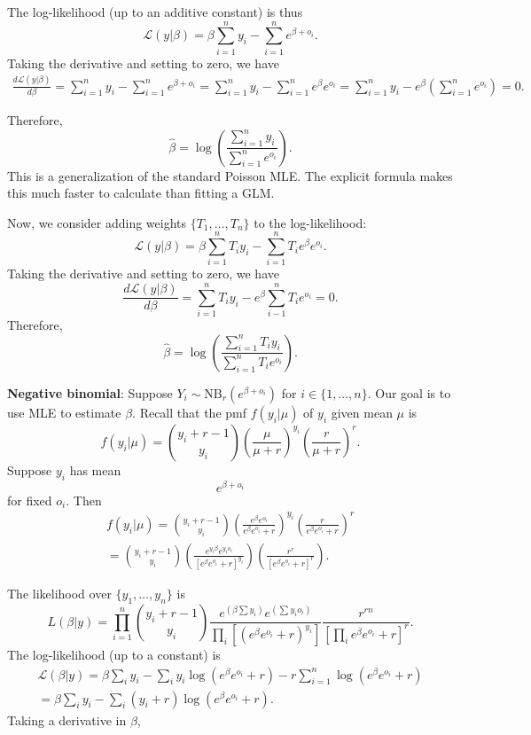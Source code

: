\documentclass[12pt]{article}
\begin{document}
The log-likelihood (up to an additive constant) is thus
$$ \mathcal{L}(y | \beta) = \beta \sum_{i=1}^n y_i -\sum_{i=1}^n e^{\beta + o_i}.$$
Taking the derivative and setting to zero, we have
\begin{multline*} \frac{  d \mathcal{L}(y | \beta) }{ d \beta} = \sum_{i=1}^n y _i - \sum_{i=1}^n e^{\beta + o_i} =\sum_{i=1}^n y_i - \sum_{i=1}^n e^\beta e^{o_i} = \sum_{i = 1}^n y_i - e^\beta \left( \sum_{i=1}^n e^{o_i}  \right) = 0.
\end{multline*}

Therefore,
$$ \hat{\beta} = \log \left( \frac{ \sum_{i=1}^n y_i }{ \sum_{i=1}^n e^{o_i} } \right).$$ This is a generalization of the standard Poisson MLE. The explicit formula makes this much faster to calculate than fitting a GLM.

Now, we consider adding weights $\{T_1, \dots, T_n \}$ to the log-likelihood:
$$ \mathcal{L}(y|\beta) = \beta \sum_{i=1}^n T_i y_i - \sum_{i=1}^n T_i e^{\beta}e^{o_i} .$$ Taking the derivative and setting to zero, we have
$$ \frac{ d \mathcal{L}(y|\beta) }{ d\beta} = \sum_{i=1}^n T_i y_i - e^\beta \sum_{i-1}^n T_i e^{o_i} = 0.$$ Therefore,
$$ \hat{\beta} = \log\left( \frac{ \sum_{i=1}^n T_i y_i }{ \sum_{i=1}^n T_i e^{o_i}} \right).$$

\textbf{Negative binomial}: Suppose $Y_i \sim \textrm{NB}_r(e^{\beta + o_i})$ for $i \in \{ 1, \dots, n \}$. Our goal is to use MLE to estimate $\beta$. Recall that the pmf $f(y_i | \mu)$ of $y_i$ given mean $\mu$ is
$$ f(y_i | \mu) = \binom{y_i + r - 1}{y_i} \left( \frac{ \mu }{ \mu + r } \right)^{y_i} \left( \frac{ r }{ \mu + r }  \right)^r.$$ Suppose $y_i$ has mean $$e^{\beta + o_i}$$ for fixed $o_i$. Then 
\begin{multline*}
f(y_i | \mu) = \binom{y_i + r - 1}{y_i} \left( \frac{ e^{\beta} e^{o_i} }{ e^{\beta}e^{o_i} + r } \right)^{y_i} \left( \frac{ r }{ e^{\beta}e^{o_i} + r } \right)^r \\ = \binom{y_i + r - 1}{y_i} \left( \frac{ e^{y_i\beta} e^{y_i o_i} }{ [e^\beta e^{o_i} + r]^{y_i} } \right) \left( \frac{r^r}{[e^{\beta} e^{o_i} + r ]^r} \right).
\end{multline*}

The likelihood over $\{y_1, \dots, y_n\}$ is
$$ L(\beta | y) = \prod_{i=1}^n \binom{ y_i + r - 1 }{ y_i }  \frac{ e^{ (\beta \sum y_i)} e^{\left(\sum y_i o_i \right)} }{  \prod_{i} \left[ \left( e^\beta e^{o_i} + r \right)^{y_i} \right] } \frac{ r^{rn} }{ \left[ \prod_i e^{\beta} e^{o_i} + r \right]^r }.$$
 The log-likelihood (up to a constant) is
 \begin{multline*} \mathcal{L}(\beta | y) = \beta \sum_i y_i - \sum_{i}  y_i \log\left( e^\beta e^{o_i} + r \right) - r \sum_{i=1}^n \log( e^{\beta} e^{o_i} + r ) \\ = \beta \sum_{i} y_i - \sum_{i} (y_i + r) \log ( e^\beta e^{o_i} + r ). \end{multline*} Taking a derivative in $\beta$, 
\end{document}
